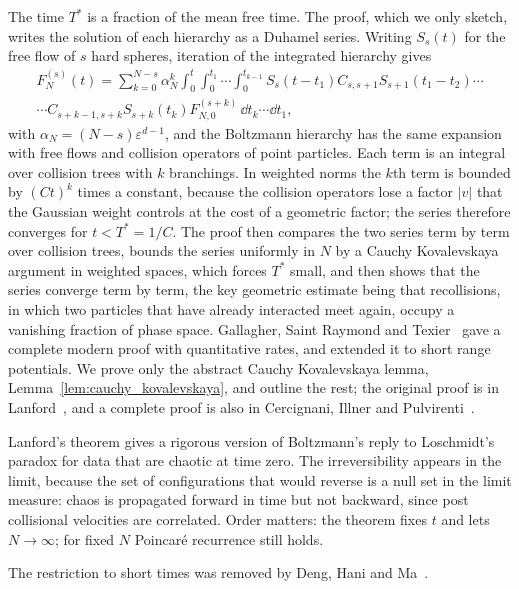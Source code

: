 The time $T^*$ is a fraction of the mean free time. The proof, which we only sketch, writes the solution of each hierarchy as a Duhamel series. Writing $S_s(t)$ for the free flow of $s$ hard spheres, iteration of the integrated hierarchy gives
\[
\begin{multlined}F^{(s)}_N(t) = \sum_{k=0}^{N-s}\alpha_N^k\int_0^t\!\!\int_0^{t_1}\!\!\cdots\!\!\int_0^{t_{k-1}}S_s(t-t_1)C_{s,s+1}S_{s+1}(t_1-t_2)\cdots\\ \cdots C_{s+k-1,s+k}S_{s+k}(t_k)F^{(s+k)}_{N,0}\,\dd t_k\cdots\dd t_1,\end{multlined}
\]
with $\alpha_N = (N-s)\varepsilon^{d-1}$, and the Boltzmann hierarchy has the same expansion with free flows and collision operators of point particles. Each term is an integral over collision trees with $k$ branchings. In weighted norms the $k$th term is bounded by $(Ct)^k$ times a constant, because the collision operators lose a factor $|v|$ that the Gaussian weight controls at the cost of a geometric factor; the series therefore converges for $t<T^* = 1/C$. The proof then compares the two series term by term over collision trees, bounds the series uniformly in $N$ by a Cauchy Kovalevskaya argument in weighted spaces, which forces $T^*$ small, and then shows that the series converge term by term, the key geometric estimate being that recollisions, in which two particles that have already interacted meet again, occupy a vanishing fraction of phase space. Gallagher, Saint Raymond and Texier~\cite{gst2013} gave a complete modern proof with quantitative rates, and extended it to short range potentials. We prove only the abstract Cauchy Kovalevskaya lemma, Lemma~\ref{lem:cauchy_kovalevskaya}, and outline the rest; the original proof is in Lanford~\cite{lanford1975}, and a complete proof is also in Cercignani, Illner and Pulvirenti~\cite{cip1994}.

Lanford's theorem gives a rigorous version of Boltzmann's reply to Loschmidt's paradox for data that are chaotic at time zero. The irreversibility appears in the limit, because the set of configurations that would reverse is a null set in the limit measure: chaos is propagated forward in time but not backward, since post collisional velocities are correlated. Order matters: the theorem fixes $t$ and lets $N\to\infty$; for fixed $N$ Poincar\'e recurrence still holds.

The restriction to short times was removed by Deng, Hani and Ma~\cite{denghanima2024}.

